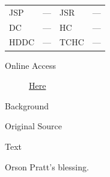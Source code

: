 				\begin{tabular}{p{0.5in}p{1in}p{0.5in}p{1in}}
				JSP	 	& ---		& JSR 		& --- \\
				DC	 	& --- 		& HC 		& --- \\
				HDDC 	& ---		& TCHC 		& --- \\
				\end{tabular}
			
			\begin{description}
				\item[Online Access] \href{https://www.josephsmithpapers.org/paper-summary/blessing-to-orson-pratt-26-april-1835/1}{Here}
			\end{description}
			
			\begin{description}
				\item[Background]
			\end{description}
			
			
			\begin{description}
				\item[Original Source]
			\end{description}
			
			
			\begin{description}
				\item[Text]
			\end{description}
			
				\begin{tightcenter}
				Orson Pratt's blessing.
				\end{tightcenter}
				
